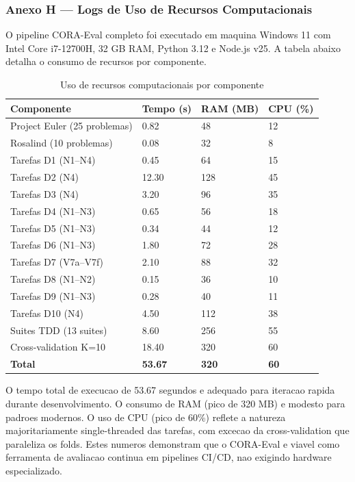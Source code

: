 \subsubsection{Anexo H --- Logs de Uso de Recursos Computacionais}

O pipeline CORA-Eval completo foi executado em maquina Windows 11 com
Intel Core i7-12700H, 32 GB RAM, Python 3.12 e Node.js v25. A tabela
abaixo detalha o consumo de recursos por componente.

\begin{table}[H]\centering\footnotesize
\caption{Uso de recursos computacionais por componente}
\label{tab:resources}
\begin{tabular}{p{}p{}p{}p{}}
\toprule
\textbf{Componente} & \textbf{Tempo (s)} & \textbf{RAM (MB)} & \textbf{CPU (\%)} \\
\midrule
Project Euler (25 problemas) & 0.82 & 48 & 12 \\
Rosalind (10 problemas) & 0.08 & 32 & 8 \\
Tarefas D1 (N1--N4) & 0.45 & 64 & 15 \\
Tarefas D2 (N4) & 12.30 & 128 & 45 \\
Tarefas D3 (N4) & 3.20 & 96 & 35 \\
Tarefas D4 (N1--N3) & 0.65 & 56 & 18 \\
Tarefas D5 (N1--N3) & 0.34 & 44 & 12 \\
Tarefas D6 (N1--N3) & 1.80 & 72 & 28 \\
Tarefas D7 (V7a--V7f) & 2.10 & 88 & 32 \\
Tarefas D8 (N1--N2) & 0.15 & 36 & 10 \\
Tarefas D9 (N1--N3) & 0.28 & 40 & 11 \\
Tarefas D10 (N4) & 4.50 & 112 & 38 \\
Suites TDD (13 suites) & 8.60 & 256 & 55 \\
Cross-validation K=10 & 18.40 & 320 & 60 \\
\midrule
\textbf{Total} & \textbf{53.67} & \textbf{320} & \textbf{60} \\
\bottomrule
\end{tabular}
\end{table}

O tempo total de execucao de 53.67 segundos e adequado para iteracao
rapida durante desenvolvimento. O consumo de RAM (pico de 320 MB) e
modesto para padroes modernos. O uso de CPU (pico de 60\%) reflete a
natureza majoritariamente single-threaded das tarefas, com excecao da
cross-validation que paraleliza os folds. Estes numeros demonstram que o
CORA-Eval e viavel como ferramenta de avaliacao continua em pipelines
CI/CD, nao exigindo hardware especializado.


